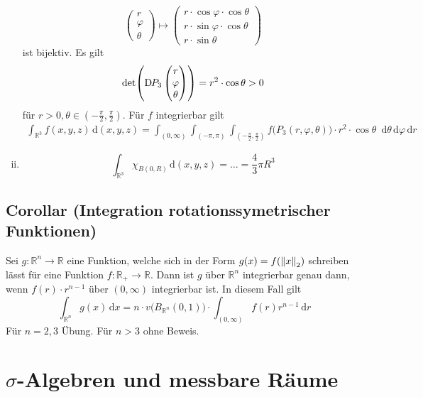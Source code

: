 \begin{enumerate}[(i)]
	\[
		\begin{pmatrix}
			r \\
			\varphi \\
			\theta
		\end{pmatrix} \mapsto
		\begin{pmatrix}
			r \cdot \cos \varphi \cdot \cos \theta \\
			r \cdot \sin \varphi \cdot \cos \theta \\
			r \cdot \sin \theta
		\end{pmatrix}
	\]
	ist bijektiv. Es gilt
	\[
		\det \enbrace*{\D P_3 \begin{pmatrix}
			r \\
			\varphi \\
			\theta
		\end{pmatrix}} = r^2 \cdot \cos \theta > 0
	\]
	für $r>0, \theta \in (- \frac{\pi}{2}, \frac{\pi}{2})$. Für $f$ integrierbar gilt
	\begin{align*}
		\int_{\mathds{R}^3} f(x,y,z)  \, \mathrm{d}(x,y,z) = \int_{(0,\infty)} \int_{(-\pi , \pi )} \int_{(- \frac{\pi}{2}, \frac{\pi}{2})}
		f\big( P_3(r, \varphi, \theta) \big) \cdot r^2  \cdot \cos \theta  \enspace \mathrm{d}\theta  \, \mathrm{d}\varphi  \, \mathrm{d}r
	\end{align*}
	\item 
	\[
		\int_{\mathds{R}^3} \chi_{B(0,R)}  \, \mathrm{d}(x,y,z) = \ldots = \frac{4}{3} \pi  R^3
	\]
\end{enumerate}

\subsection{Corollar (Integration rotationssymetrischer Funktionen)} %
\label{sub:86}
Sei $g : \mathds{R}^n \to \mathds{R}$ eine Funktion, welche sich in der Form $g(x) = f(\norm[2]{x})$ schreiben lässt für eine Funktion $f : \mathds{R}_+ \to \mathds{R}$.
Dann ist $g$ über $\mathds{R}^n$ integrierbar genau dann, wenn $f(r) \cdot r^{n-1}$ über $(0, \infty)$ integrierbar ist. In diesem Fall gilt 
\[
	\int_{\mathds{R}^n} \! g(x)  \, \mathrm{d}x  = n \cdot v\big(B_{\mathds{R}^n}(0,1)\big) \cdot \int_{(0,\infty)}\! f(r) r^{n-1}  \, \mathrm{d}r
\]
Für $n=2,3$ Übung. Für $n>3$ ohne Beweis. 
\newpage

\section{$\sigma$-Algebren und messbare Räume} %
\label{sec:9}

